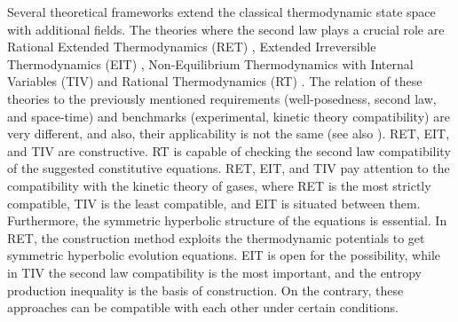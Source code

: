 \documentclass[sn-mathphys]{sn-jnl}%
\theoremstyle{thmstyleone}%
\theoremstyle{thmstyletwo}%
\theoremstyle{thmstylethree}%
\begin{document}
{Several theoretical frameworks extend the classical thermodynamic state space with additional fields. The theories where the second law plays a crucial role are Rational Extended Thermodynamics (RET) \cite{MulRug98b,DreStr93a}, Extended Irreversible Thermodynamics (EIT) \cite{Gya77a,JouAta92b,LebEta08b,LebEta11a,CasJou03a}, Non-Equilibrium Thermodynamics with Internal Variables (TIV) \cite{Ver83a,Nyi91a1,VanFul12a,KovVan15a} and Rational Thermodynamics (RT) \cite{GreNag91a,FabMor03a,Mar17a,CapEta21a}. The relation of these theories to the previously mentioned requirements (well-posedness, second law, and space-time) and benchmarks (experimental, kinetic theory compatibility) are very different, and also, their applicability is not the same (see also \cite{Van20a}). RET, EIT, and TIV are constructive. RT is capable of checking the second law compatibility of the suggested constitutive equations. RET, EIT, and TIV pay attention to the compatibility with the kinetic theory of gases, where RET is the most strictly compatible, TIV is the least compatible, and EIT is situated between them.
Furthermore, the symmetric hyperbolic structure of the equations is essential. In RET, the construction method exploits the thermodynamic potentials to get symmetric hyperbolic evolution equations. EIT is open for the possibility, while in TIV the second law compatibility is the most important, and the entropy production inequality is the basis of construction. On the contrary, these approaches can be compatible with each other under certain conditions.

}
\end{document}
